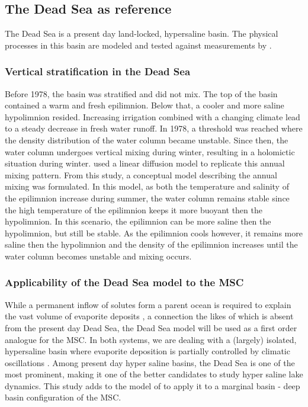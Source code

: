 \documentclass[twocolumn]{article}
\begin{document}
\subsection{The Dead Sea as reference}
The Dead Sea is a present day land-locked, hypersaline basin. The physical processes in this basin are modeled and tested against measurements by \cite{Heiden2017Application}.

\subsubsection{Vertical stratification in the Dead Sea}
\label{sect:Dead_Sea_model}
 Before 1978, the basin was stratified and did not mix. The top of the basin contained a warm and fresh epilimnion. Below that, a cooler and more saline hypolimnion resided. Increasing irrigation combined with a changing climate lead to a steady decrease in fresh water runoff. In 1978, a threshold was reached where the density distribution of the water column became unstable. Since then, the water column undergoes vertical mixing during winter, resulting in a holomictic situation during winter. \cite{Heiden2017Application} used a linear diffusion model to replicate this annual mixing pattern. From this study, a conceptual model describing the annual mixing was formulated. In this model, as both the temperature and salinity of the epilimnion increase during summer, the water column remains stable since the high temperature of the epilimnion keeps it more buoyant then the hypolimnion. In this scenario, the epilimnion can be more saline then the hypolimnion, but still be stable. As the epilimnion cools however, it remains more saline then the hypolimnion and the density of the epilimnion increases until the water column becomes unstable and mixing occurs. 
 
\subsubsection{Applicability of the Dead Sea model to the MSC}
While a permanent inflow of solutes form a parent ocean is required to explain the vast volume of evaporite deposits \citep{garcia2018geochemical}, a connection the likes of which is absent from the present day Dead Sea, the Dead Sea model will be used as a first order analogue for the MSC. In both systems, we are dealing with a (largely) isolated, hypersaline basin where evaporite deposition is partially controlled by climatic oscillations \citep{manzi2012high}. Among present day hyper saline basins, the Dead Sea is one of the most prominent, making it one of the better candidates to study hyper saline lake dynamics. This study adds to the model of \cite{Heiden2017Application} to apply it to a marginal basin - deep basin configuration of the MSC.
\end{document}
